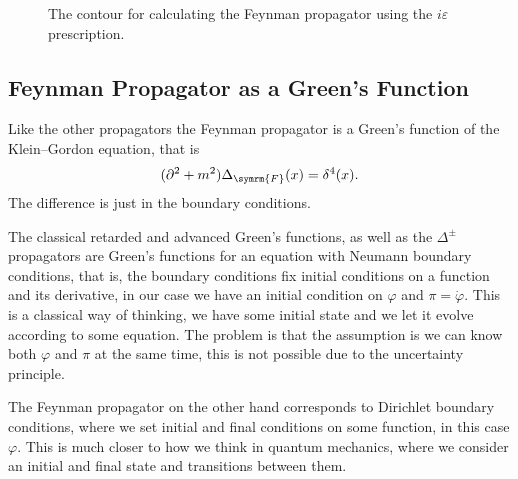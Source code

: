 \documentclass[fleqn]{NotesClass}
\newcommand{\dalembertian}{\partial^2}
\let\Re\relax
\let\Im\relax
\DeclareMathOperator{\Re}{Re}
\DeclareMathOperator{\Im}{Im}
\newcommand{\feynman}{\symrm{F}}
\begin{document}
    \begin{figure}
        \caption{The contour for calculating the Feynman propagator using the \(i\varepsilon\) prescription.}
        \label{fig:contour for feynman propagator with i epsilon prescription}
    \end{figure}
    
    \subsection{Feynman Propagator as a Green's Function}
    Like the other propagators the Feynman propagator is a Green's function of the Klein--Gordon equation, that is
    \begin{equation}
        (\dalembertian + m^2) \Delta_{\feynman}(x) = \delta^4(x).
    \end{equation}
    The difference is just in the boundary conditions.
    
    The classical retarded and advanced Green's functions, as well as the \(\Delta^{\pm}\) propagators are Green's functions for an equation with Neumann boundary conditions, that is, the boundary conditions fix initial conditions on a function and its derivative, in our case we have an initial condition on \(\varphi\) and \(\pi = \dot{\varphi}\).
    This is a classical way of thinking, we have some initial state and we let it evolve according to some equation.
    The problem is that the assumption is we can know both \(\varphi\) and \(\pi\) at the same time, this is not possible due to the uncertainty principle.
    
    The Feynman propagator on the other hand corresponds to Dirichlet boundary conditions, where we set initial and final conditions on some function, in this case \(\varphi\).
    This is much closer to how we think in quantum mechanics, where we consider an initial and final state and transitions between them.
    
\end{document}
